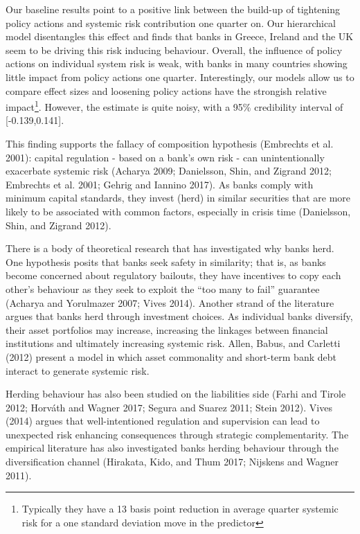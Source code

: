 \documentclass[
  10pt,
]{article}
\begin{document}
Our baseline results point to a positive link between the build-up of
tightening policy actions and systemic risk contribution one quarter on.
Our hierarchical model disentangles this effect and finds that banks in
Greece, Ireland and the UK seem to be driving this risk inducing
behaviour. Overall, the influence of policy actions on individual system
risk is weak, with banks in many countries showing little impact from
policy actions one quarter. Interestingly, our models allow us to
compare effect sizes and loosening policy actions have the strongish
relative impact\footnote{Typically they have a 13 basis point reduction
  in average quarter systemic risk for a one standard deviation move in
  the predictor}. However, the estimate is quite noisy, with a 95\%
credibility interval of {[}-0.139,0.141{]}.

This finding supports the fallacy of composition hypothesis (Embrechts
et al. 2001): capital regulation - based on a bank's own risk - can
unintentionally exacerbate systemic risk (Acharya 2009; Danielsson,
Shin, and Zigrand 2012; Embrechts et al. 2001; Gehrig and Iannino 2017).
As banks comply with minimum capital standards, they invest (herd) in
similar securities that are more likely to be associated with common
factors, especially in crisis time (Danielsson, Shin, and Zigrand 2012).

There is a body of theoretical research that has investigated why banks
herd. One hypothesis posits that banks seek safety in similarity; that
is, as banks become concerned about regulatory bailouts, they have
incentives to copy each other's behaviour as they seek to exploit the
``too many to fail'' guarantee (Acharya and Yorulmazer 2007; Vives
2014). Another strand of the literature argues that banks herd through
investment choices. As individual banks diversify, their asset
portfolios may increase, increasing the linkages between financial
institutions and ultimately increasing systemic risk. Allen, Babus, and
Carletti (2012) present a model in which asset commonality and
short-term bank debt interact to generate systemic risk.

Herding behaviour has also been studied on the liabilities side (Farhi
and Tirole 2012; Horváth and Wagner 2017; Segura and Suarez 2011; Stein
2012). Vives (2014) argues that well-intentioned regulation and
supervision can lead to unexpected risk enhancing consequences through
strategic complementarity. The empirical literature has also
investigated banks herding behaviour through the diversification channel
(Hirakata, Kido, and Thum 2017; Nijskens and Wagner 2011).
\end{document}
